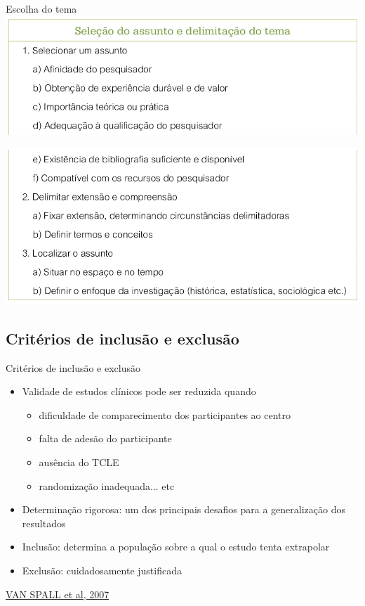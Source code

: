 \documentclass{beamer}
\begin{document}
\begin{frame}{Escolha do tema}
  \includegraphics[width=\textwidth]{Etapas/delimitacao1}

  \includegraphics[width=\textwidth]{Etapas/delimitacao2}
\end{frame}

\subsection{Critérios de inclusão e exclusão}

\begin{frame}{Critérios de inclusão e exclusão}
  \begin{itemize}
  \item Validade de estudos clínicos pode ser reduzida quando
    \begin{itemize}
    \item dificuldade de comparecimento dos participantes ao centro
    \item falta de adesão do participante
    \item ausência do TCLE
    \item randomização inadequada... etc
    \end{itemize}
  \item Determinação rigorosa: um dos principais desafios para a generalização dos resultados
  \item Inclusão: determina a população sobre a qual o estudo tenta extrapolar
  \item Exclusão: cuidadosamente justificada
  \end{itemize}

  \vfill
  \scriptsize
  \hfill \href{https://doi.org/10.1001/jama.297.11.1233}{VAN SPALL et al, 2007}
\end{frame}
\end{document}
